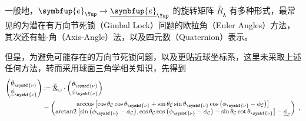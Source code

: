 一般地，$\symbfup{e}_{\Yup} \rightarrow \underline{\symbfup{e}}_{\Yup}$ 的旋转矩阵 $\bar{\bar{\underline{R}}}_{\Yup}$ 有多种形式，最常见的为潜在有万向节死锁（Gimbal Lock）问题的欧拉角（Euler Angles）方法，其次还有轴-角（Axis-Angle）法，以及四元数（Quaternion）表示。

但是，为避免可能存在的万向节死锁问题，以及更贴近球坐标系，这里未采取上述任何方法，转而采用球面三角学相关知识，先得到
\begin{align} \label{eq:2-37}
    \begin{pmatrix} \underline{\theta}_{\symbf{\nu}} \\ \underline{\phi}_{\symbf{\nu}} \end{pmatrix} &:= \bar{\bar{\underline{\mathcal{R}}}}_{\circleddash} \cdot \begin{pmatrix} \theta_{\symbf{\nu}} \\ \phi_{\symbf{\nu}} \end{pmatrix} \\ &= \begin{pmatrix} \arccos \left[ \cos{\theta_{\mathcal{C}}} \cos{\theta_{\symbf{\nu}}} + \sin{\theta_{\mathcal{C}}} \sin{\theta_{\symbf{\nu}}} \cos{\left( \phi_{\symbf{\nu}} - \phi_{\mathcal{C}} \right)} \right] \\ \text{arctan2} \left[ \sin{\left( \phi_{\symbf{\nu}} - \phi_{\mathcal{C}} \right)}, \cos{\theta_{\mathcal{C}}} \cos{\left( \phi_{\symbf{\nu}} - \phi_{\mathcal{C}} \right)} - \sin{\theta_{\mathcal{C}}} \cot{\theta_{\symbf{\nu}}} \right] - \underline{\phi}_{\mathcal{C}} \end{pmatrix} ~, \notag
\end{align}
